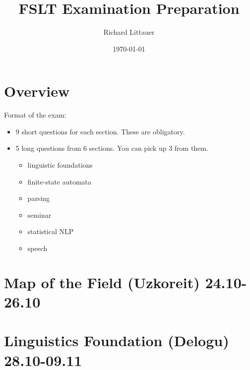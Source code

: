 \documentclass[11pt]{article}
\title{FSLT Examination Preparation}
\author{Richard Littauer}		%
\date{\today}                          		%
\newenvironment{itemise}{
\begin{itemize}
  \setlength{\itemsep}{1pt}
  \setlength{\parskip}{0pt}
  \setlength{\parsep}{0pt}
}{\end{itemize}}
\begin{document}
\maketitle
\section*{Overview}
Format of the exam:
\begin{itemise}
\item 9 short questions for each section. These are obligatory. 
\item 5 long questions from 6 sections. You can pick up 3 from them. 
\begin{itemise}
\item linguistic foundations
\item finite-state automata
\item parsing
\item seminar
\item statistical NLP
\item speech
\end{itemise}
\end{itemise}

\section{Map of the Field (Uzkoreit) 24.10-26.10}

\section{Linguistics Foundation (Delogu) 28.10-09.11}
\end{document}
